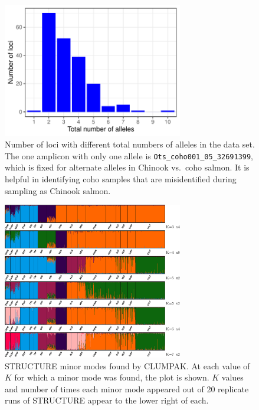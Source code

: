 \begin{figure}
\begin{center}
\includegraphics[width=0.7\textwidth]{images/num-alle-barplot.pdf}
\end{center}
\caption[Number of loci with different
total numbers of alleles]{\footnotesize Number of loci with different
total numbers of alleles in the data set. The one amplicon with only
one allele is {\tt Ots\_coho001\_05\_32691399}, which is fixed for alternate alleles
in Chinook vs.\ coho salmon. It is helpful in identifying coho samples that are
misidentified during sampling as Chinook salmon.}
\label{fig:num-alle}
\end{figure}




\begin{figure}
\begin{center}
\includegraphics[width=0.7\textwidth]{images/minor-modes-crop.pdf}
\end{center}
\caption[STRUCTURE minor modes found by CLUMPAK]{\footnotesize STRUCTURE minor modes found by CLUMPAK.
At each value of $K$ for which a minor mode was found, the plot is shown.  $K$ values and number of times each minor
mode appeared out of 20 replicate runs of STRUCTURE appear to the lower right of each.}
\label{fig:minor-modes}
\end{figure}


